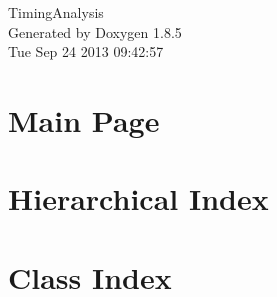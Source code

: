 \documentclass[twoside]{book}
\newcommand{\clearemptydoublepage}{%
  \newpage{\pagestyle{empty}\cleardoublepage}%
}
\begin{document}
\hypersetup{pageanchor=false}
\begin{titlepage}
\vspace*{7cm}
\begin{center}%
{\Large Timing\-Analysis }\\
\vspace*{1cm}
{\large Generated by Doxygen 1.8.5}\\
\vspace*{0.5cm}
{\small Tue Sep 24 2013 09:42:57}\\
\end{center}
\end{titlepage}
\clearemptydoublepage
\tableofcontents
\clearemptydoublepage
{}
\hypersetup{pageanchor=true}

\chapter{Main Page}
\label{index}\hypertarget{index}{}
\chapter{Hierarchical Index}

\chapter{Class Index}

\end{document}
